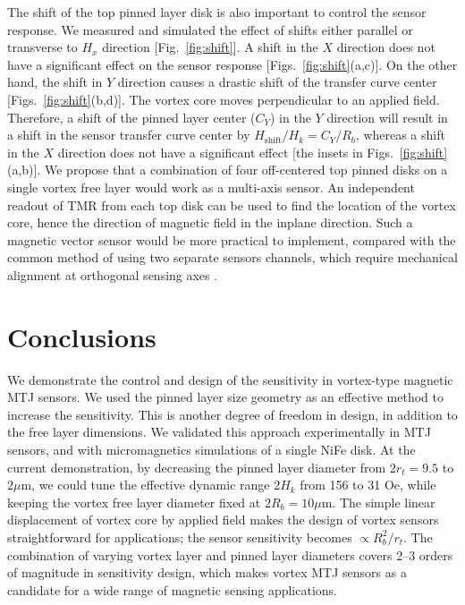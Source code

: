 \documentclass[10pt]{iopart}
\begin{document}
    The shift of the top pinned layer disk is also important to control the sensor response. We measured and simulated the effect of shifts either parallel or transverse to $H_x$ direction [Fig.~\ref{fig:shift}]. A shift in the $X$ direction does not have a significant effect on the sensor response [Figs.~\ref{fig:shift}(a,c)]. On the other hand, the shift in $Y$ direction causes a drastic shift of the transfer curve center [Figs.~\ref{fig:shift}(b,d)]. The vortex core moves perpendicular to an applied field. Therefore, a shift of the pinned layer center ($C_Y$) in the $Y$ direction will result in a shift in the sensor transfer curve center by $H_\mathrm{shift}/H_k = C_Y/R_b$, whereas a shift in the $X$ direction does not have a significant effect [the insets in Figs.~\ref{fig:shift}(a,b)].
    We propose that a combination of four off-centered top pinned disks on a single vortex free layer would work as a multi-axis sensor. An independent readout of TMR from each top disk can be used to find the location of the vortex core, hence the direction of magnetic field in the inplane direction. Such a magnetic vector sensor would be more practical to implement, compared with the common method of using two separate sensors channels, which require mechanical alignment at orthogonal sensing axes \cite{yamazaki_2011}.

\section{Conclusions}
    We demonstrate the control and design of the sensitivity in vortex-type magnetic MTJ sensors. We used the pinned layer size geometry as an effective method to increase the sensitivity. This is another degree of freedom in design, in addition to the free layer dimensions. {We validated this approach experimentally in MTJ sensors, and with micromagnetics simulations of a single NiFe disk.} At the current demonstration, by decreasing the pinned layer diameter from {$2r_t = 9.5$ to $2 \mu$m, we could tune the effective dynamic range $2H_k$ from 156 to 31 Oe, while keeping the vortex free layer diameter fixed at $2R_b = 10 \mu$m.} {The simple linear displacement of vortex core by applied field makes the design of vortex sensors straightforward for applications; the sensor sensitivity becomes $\propto R_b^2 / r_t$. The combination of varying vortex layer and pinned layer diameters covers 2--3 orders of magnitude in sensitivity design, which makes vortex MTJ sensors as a candidate for a wide range of magnetic sensing applications.} 
\end{document}
